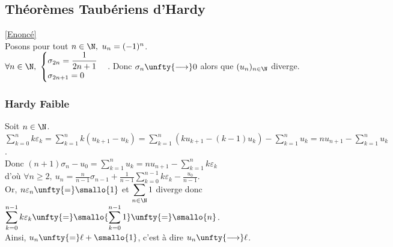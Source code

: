\documentclass{book}
\begin{document}
	\subsection{Théorèmes Taubériens d'Hardy }
	\label{Théorèmes Taubériens d'Hardy corrigé}
	\textcolor{blue}{\hyperref[Théorèmes Taubériens d'Hardy]{[Enoncé]}}\\
	Posons pour tout $n\in \N,\ u_n=(-1)^n$.\\
	$\forall n\in \N,\ \begin{cases}\sigma_{2n}=\displaystyle\frac{1}{2n+1}\\\sigma_{2n+1}=0\end{cases}$. Donc $\sigma_n\unfty{\longrightarrow}0$ alors que $(u_n)_{n\in \N}$ diverge.
	
	\subsubsection{Hardy Faible }
	Soit $n\in \N$.\\
	$\displaystyle\sum_{k=0}^nk\varepsilon_k=\sum_{k=1}^nk(u_{k+1}-u_k)=\sum_{k=1}^n(ku_{k+1}-(k-1)u_k)-\sum_{k=1}^nu_k=nu_{n+1}-\sum_{k=1}^nu_k$.\\
	Donc $(n+1)\sigma_n-u_0=\displaystyle\sum_{k=1}^nu_k=nu_{n+1}-\sum_{k=1}^nk\varepsilon_k$ \\d'où $\forall n\geq 2,\ u_n=\displaystyle\frac{n}{n-1}\sigma_{n-1}+\frac{1}{n-1}\sum_{k=0}^{n-1}k\varepsilon_k-\frac{u_0}{n-1}$.\\
	Or, $n\varepsilon_n\unfty{=}\smallo{1}$ et $\displaystyle\sum_{n\in \N}1$ diverge donc $\displaystyle\sum_{k=0}^{n-1}k\varepsilon_k\unfty{=}\smallo{\sum_{k=0}^{n-1}1}\unfty{=}\smallo{n}$.\\
	Ainsi, $u_n\unfty{=}\ell+\smallo{1}$, c'est à dire $u_n\unfty{\longrightarrow}\ell$.
	
\end{document}
